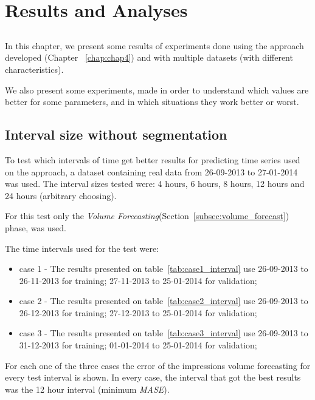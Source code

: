 \chapter{Results and Analyses} \label{chap:experiments}

\section*{}

In this chapter, we present some results of experiments done using the approach developed
(Chapter ~\ref{chap:chap4}) and with multiple datasets (with different characteristics).

We also present some experiments, made in order to understand which values are better
for some parameters, and in which situations they work better or worst.

\section{Interval size without segmentation}

To test which intervals of time get better results for predicting time series
used on the approach, a dataset containing real data from 26-09-2013 to
27-01-2014 was used. The interval sizes tested were: 4 hours, 6 hours, 8 hours,
12 hours and 24 hours (arbitrary choosing).

For this test only the \emph{Volume Forecasting}(Section~\ref{subsec:volume_forecast}) phase, was used.

The time intervals used for the test were:
\begin{itemize}
\item case 1 - The results presented on table~\ref{tab:case1_interval} use
26-09-2013 to 26-11-2013 for training; 27-11-2013 to 25-01-2014 for validation;
\item case 2 - The results presented on table~\ref{tab:case2_interval} use
26-09-2013 to 26-12-2013 for training; 27-12-2013 to 25-01-2014 for validation;
\item case 3 - The results presented on table~\ref{tab:case3_interval} use
26-09-2013 to 31-12-2013 for training; 01-01-2014 to 25-01-2014 for validation;
\end{itemize}

For each one of the three cases the error of the
impressions volume forecasting for every test interval is shown.
In every case, the interval that got the best results was the 12 hour interval
(minimum \emph{MASE}).

